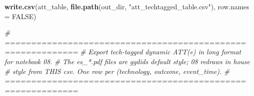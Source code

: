 \documentclass[
]{article}
\newenvironment{Shaded}{\begin{snugshade}}{\end{snugshade}}
\newcommand{\AttributeTok}[1]{\textcolor[rgb]{0.13,0.29,0.53}{#1}}
\newcommand{\CommentTok}[1]{\textcolor[rgb]{0.56,0.35,0.01}{\textit{#1}}}
\newcommand{\ConstantTok}[1]{\textcolor[rgb]{0.56,0.35,0.01}{#1}}
\newcommand{\FunctionTok}[1]{\textcolor[rgb]{0.13,0.29,0.53}{\textbf{#1}}}
\newcommand{\NormalTok}[1]{#1}
\newcommand{\StringTok}[1]{\textcolor[rgb]{0.31,0.60,0.02}{#1}}
\begin{document}
\begin{Shaded}
\begin{Highlighting}[]
\FunctionTok{write.csv}\NormalTok{(att\_table,}
          \FunctionTok{file.path}\NormalTok{(out\_dir, }\StringTok{"att\_techtagged\_table.csv"}\NormalTok{), }\AttributeTok{row.names =} \ConstantTok{FALSE}\NormalTok{)}
\end{Highlighting}
\end{Shaded}

\begin{Shaded}
\begin{Highlighting}[]
\CommentTok{\# ============================================================}
\CommentTok{\# Export tech{-}tagged dynamic ATT(e) in long format for notebook 08.}
\CommentTok{\# The es\_*.pdf files are ggdid\textquotesingle{}s default style; 08 redraws in house}
\CommentTok{\# style from THIS csv. One row per (technology, outcome, event\_time).}
\CommentTok{\# ============================================================}


\end{Highlighting}
\end{Shaded}
\end{document}
